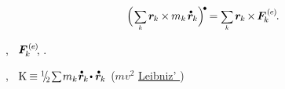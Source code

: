 \nopagebreak\vspace{-0.4em}
\begin{equation}\label{balanceofrotationalmomentum.onlyexternalforces.discretepoints}
\Bigl( \hspace{.2ex} \scalebox{.8}{$ \displaystyle \sum_{\smash{k}} $} \hspace{.3ex} \locationvector_{\hspace{-0.1ex}k} \hspace{-0.1ex} \times \hspace{-0.1ex} m_k \hspace{.2ex} \mathdotabove{\locationvector}_{\hspace{-0.1ex}k}
\Bigr)^{\hspace{-0.1em}\tikz[baseline=-0.2ex]\draw[black, fill=black] (0,0) circle (.28ex);} \hspace{-0.15ex}
= \scalebox{.8}{$ \displaystyle \sum_{\smash{k}} $} \hspace{.3ex} \locationvector_{\hspace{-0.1ex}k} \hspace{-0.2ex} \times \hspace{-0.2ex} \bm{F}^{\smthexternal}_{\hspace{-0.16ex}k}
\hspace{-0.1ex} .
\end{equation}

\vspace{-0.3em}
,
~{${\bm{F}^{\smthexternal}_{\hspace{-0.16ex}k}\hspace{-0.4ex}}$},
.

,
~${\kineticenergyinmechanics
\equiv
\verynicefrac{1}{2} \hspace{.2ex} \raisebox{.1em}{\scalebox{.66}{$ \displaystyle \sum $}} \hspace{.2ex}
m_{k} \hspace{.1ex} \mathdotabove{\locationvector}_{\hspace{-0.1ex}k} \hspace{-0.3ex} \dotp \mathdotabove{\locationvector}_{\hspace{-0.1ex}k} }$
($mv^2$\ru{\:---}
\href{https://en.wikipedia.org/wiki/Vis_viva}{Leibniz’ }) %

